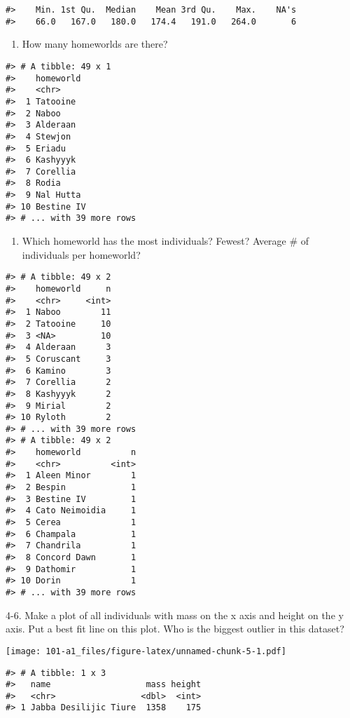 \documentclass[
]{book}
\providecommand{\tightlist}{%
  \setlength{\itemsep}{0pt}\setlength{\parskip}{0pt}}
\begin{document}
\begin{verbatim}
#>    Min. 1st Qu.  Median    Mean 3rd Qu.    Max.    NA's 
#>    66.0   167.0   180.0   174.4   191.0   264.0       6
\end{verbatim}

\begin{enumerate}
\def\labelenumi{\arabic{enumi}.}
\setcounter{enumi}{1}
\tightlist
\item
  How many homeworlds are there?
\end{enumerate}

\begin{verbatim}
#> # A tibble: 49 x 1
#>    homeworld 
#>    <chr>     
#>  1 Tatooine  
#>  2 Naboo     
#>  3 Alderaan  
#>  4 Stewjon   
#>  5 Eriadu    
#>  6 Kashyyyk  
#>  7 Corellia  
#>  8 Rodia     
#>  9 Nal Hutta 
#> 10 Bestine IV
#> # ... with 39 more rows
\end{verbatim}

\begin{enumerate}
\def\labelenumi{\arabic{enumi}.}
\setcounter{enumi}{2}
\tightlist
\item
  Which homeworld has the most individuals? Fewest? Average \# of individuals per homeworld?
\end{enumerate}

\begin{verbatim}
#> # A tibble: 49 x 2
#>    homeworld     n
#>    <chr>     <int>
#>  1 Naboo        11
#>  2 Tatooine     10
#>  3 <NA>         10
#>  4 Alderaan      3
#>  5 Coruscant     3
#>  6 Kamino        3
#>  7 Corellia      2
#>  8 Kashyyyk      2
#>  9 Mirial        2
#> 10 Ryloth        2
#> # ... with 39 more rows
#> # A tibble: 49 x 2
#>    homeworld          n
#>    <chr>          <int>
#>  1 Aleen Minor        1
#>  2 Bespin             1
#>  3 Bestine IV         1
#>  4 Cato Neimoidia     1
#>  5 Cerea              1
#>  6 Champala           1
#>  7 Chandrila          1
#>  8 Concord Dawn       1
#>  9 Dathomir           1
#> 10 Dorin              1
#> # ... with 39 more rows
\end{verbatim}

4-6. Make a plot of all individuals with mass on the x axis and height on the y axis. Put a best fit line on this plot. Who is the biggest outlier in this dataset?

\texttt{[image: 101-a1\_files/figure-latex/unnamed-chunk-5-1.pdf]}

\begin{verbatim}
#> # A tibble: 1 x 3
#>   name                   mass height
#>   <chr>                 <dbl>  <int>
#> 1 Jabba Desilijic Tiure  1358    175
\end{verbatim}
\end{document}
